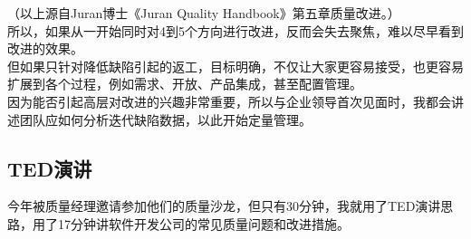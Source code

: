 （以上源自Juran博士《Juran Quality Handbook》第五章质量改进。）\\
所以，如果从一开始同时对4到5个方向进行改进，反而会失去聚焦，难以尽早看到改进的效果。\\
但如果只针对降低缺陷引起的返工，目标明确，不仅让大家更容易接受，也更容易扩展到各个过程，例如需求、开放、产品集成，甚至配置管理。\\
因为能否引起高层对改进的兴趣非常重要，所以与企业领导首次见面时，我都会讲述团队应如何分析迭代缺陷数据，以此开始定量管理。\\

\hypertarget{tedux6f14ux8bb2}{%
\subsection{TED演讲}\label{tedux6f14ux8bb2}}

今年被质量经理邀请参加他们的质量沙龙，但只有30分钟，我就用了TED演讲思路，用了17分钟讲软件开发公司的常见质量问题和改进措施。

